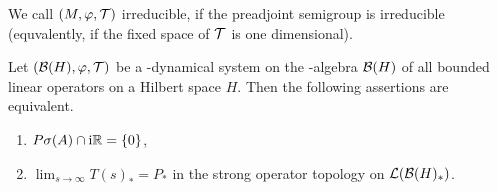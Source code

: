 We call $ (M,\phi,\TT) $  irreducible, if the preadjoint semigroup is irreducible (equvalently, if the fixed space of\/ $ \mathcal{T} $  is one dimensional).
\begin{proposition}\label{prop:d4-3.7}
Let $ (\BH,\phi,\TT) $  be a \WA-dynamical system on the \WA-algebra $ \mathcal{B}(H) $  of all bounded linear operators on a Hilbert space $ H $.
Then the following assertions are equivalent.
\begin{enumerate}[\upshape (a)]
\item
$ P\sigma(A) \cap \mathrm{i}\mathbb{R} = \{0\} $,

\item
$ \lim_{s \to \infty} T(s)_{*} = P_{*} $  in the strong operator topology on $ \mathcal{L}(\mathcal{B}(H)_{*}) $.
\end{enumerate}
\end{proposition}
